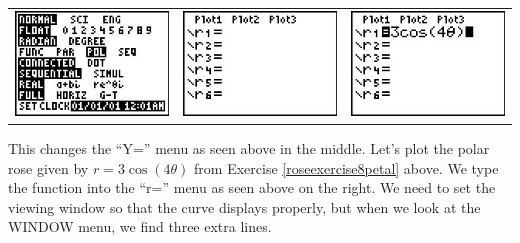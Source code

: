\begin{center}

\begin{tabular}{ccc}

\includegraphics[width=1.8in]{./AppExtGraphics/Polar01.jpg} &
\hspace{0.05in} \includegraphics[width=1.8in]{./AppExtGraphics/Polar02.jpg} & 
\hspace{0.05in} \includegraphics[width=1.8in]{./AppExtGraphics/Polar03.jpg} \\

\end{tabular} 

\end{center}

This changes the ``Y='' menu as seen above in the middle.  Let's plot the polar rose given by $r = 3\cos(4\theta)$ from Exercise \ref{roseexercise8petal} above. We type the function into the ``r='' menu as seen above on the right.  We need to set the viewing window so that the curve displays properly, but when we look at the WINDOW menu, we find three extra lines.


